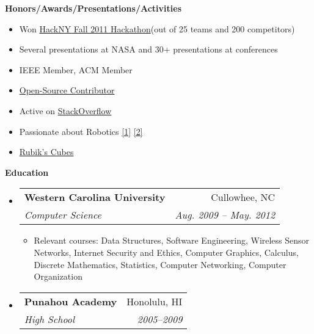 \documentclass[letterpaper,8pt]{article}
\makeatletter
\newcommand{\resitem}[1]{\item #1 \vspace{-2pt}}
\newcommand{\resheading}[1]{{\large \colorbox{mygrey}{\begin{minipage}{\textwidth}{\textbf{#1 \vphantom{p\^{E}}}}\end{minipage}}}}
\newcommand{\ressubheading}[4]{
\begin{tabular*}{2.0in}{l@{\extracolsep{\fill}}r}
		\textbf{#1} & #2 \\
		\textit{#3} & \textit{#4} \\
\end{tabular*}\vspace{-6pt}}
\makeatother
\begin{document}
\resheading{Honors/Awards/Presentations/Activities}
\begin{itemize}
   \resitem{Won \href{http://www.youtube.com/watch?v=ga6RPRAFRUY}{HackNY Fall 2011 Hackathon}(out of 25 teams and 200 competitors)}
   \resitem{Several presentations at NASA and 30+ presentations at conferences}
   \resitem{IEEE Member, ACM Member}
   \resitem{\href{https://github.com/ranman}{Open-Source Contributor}}
   \resitem{Active on \href{http://stackoverflow.com/users/240004/ranman}{StackOverflow}}
   \resitem{Passionate about Robotics
      \href{http://robotics.punahou.edu/}{[1]}
      \href{http://irg.arc.nasa.gov}{[2]}}
   \resitem{\href{http://www.youtube.com/user/ranman96734}{Rubik's Cubes}}
\end{itemize}
\resheading{Education}
\begin{itemize}
\item
   \ressubheading{Western Carolina University}{Cullowhee, NC}{Computer Science}{Aug. 2009 -- May. 2012}
   \begin{itemize}
      \resitem{Relevant courses: Data Structures, Software Engineering, Wireless Sensor Networks, Internet Security and Ethics, Computer Graphics, Calculus, Discrete Mathematics, Statistics, Computer Networking, Computer Organization}
   \end{itemize}
\item
   \ressubheading{Punahou Academy}{Honolulu, HI}{High School}{2005--2009}
\end{itemize}
\end{document}

